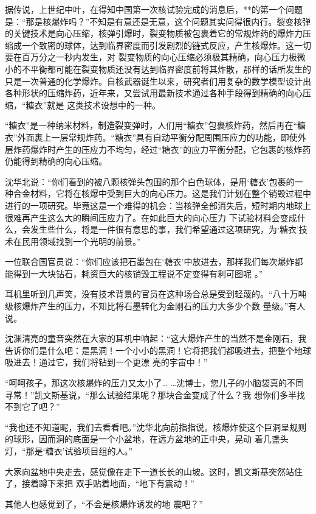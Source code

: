 \documentclass{article}
\begin{document}
据传说，上世纪中叶，在得知中国第一次核试验完成的消息后，**的第一个问题是：“那是核爆炸吗？”不知是有意还是无意，这个问题其实问得很内行。裂变核弹的关键技术是向心压缩，核弹引爆时，裂变物质被包裹着它的常规炸药的爆炸力压缩成一个致密的球体，达到临界密度而引发剧烈的链式反应，产生核爆炸。这一切要在百万分之一秒内发生，对
\newpage
裂变物质的向心压缩必须极其精确，向心压力极微小的不平衡都可能在裂变物质还没有达到临界密度前将其炸散，那样的话所发生的只是一次普通的化学爆炸。自核武器诞生以来，研究者们用复杂的数学模型设计出各种形状的压缩炸药，近年来，又尝试用最新技术通过各种手段得到精确的向心压缩，“糖衣”就是
这类技术设想中的一种。 

“糖衣”是一种纳米材料，制造裂变弹时，人们用“糖衣”包裹核炸药，然后再在“糖衣”外面裹上一层常规炸药。“糖衣”具有自动平衡分配周围压应力的功能，即使外层炸药爆炸时产生的压应力不均匀，经过“糖衣”的应力平衡分配，它包裹的核炸药
仍能得到精确的向心压缩。 

沈华北说：“你们看到的被八颗核弹头包围的那个白色球体，是用‘糖衣’包裹的一种合金材料，它将在核爆中受到巨大的向心压力。这是我们计划在整个销毁过程中进行的一项研究。毕竟这是一个难得的机会：当核弹全部消失后，短时期内地球上很难再产生这么大的瞬间压应力了。在如此巨大的向心压力
\newpage
下试验材料会变成什么，会发生些什么，将是一件很有意思的事，我们希望通过这项研究，为‘糖衣’技
术在民用领域找到一个光明的前景。” 

一位联合国官员说：“你们应该把石墨包在‘糖衣’中放进去，那样我们每次爆炸都能得到一大块钻石，耗资巨大的核销毁工程说不定变得有利可图呢
。” 

耳机里听到几声笑，没有技术背景的官员在这种场合总是受到轻蔑的。“八十万吨级核爆炸产生的压力，不知比将石墨转化为金刚石的压力大多少个数
量级。”有人说。 

沈渊清亮的童音突然在大家的耳机中响起：“这大爆炸产生的当然不是金刚石，我告诉你们是什么吧：是黑洞！一个小小的黑洞！它将把我们都吸进去，把整个地球吸进去！通过它，我们将钻到一个更漂
亮的宇宙中！” 

“呵呵孩子，那这次核爆炸的压力又太小了…
\newpage
…沈博士，您儿子的小脑袋真的不同寻常！”凯文斯基说，“那么试验结果呢？那块合金变成了什么？我
想你们多半找不到它了吧？” 

“我也还不知道昵，我们去看看吧。”沈华北向前指指说。核爆炸使这个巨洞呈规则的球形，因而洞的底面是一个小盆地，在远方盆地的正中央，晃动
着几盏头灯，“那是‘糖衣’试验项目组的人。” 

大家向盆地中央走去，感觉像在走下一道长长的山坡。这时，凯文斯基突然站住了，接着蹲下来把
双手贴着地面，“地下有震动！” 

其他人也感觉到了，“不会是核爆炸诱发的地
震吧？” 
\end{document}
